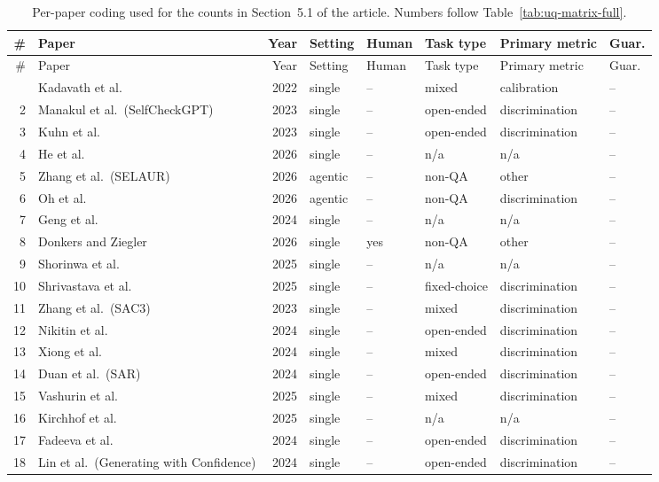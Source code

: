 \documentclass[acmsmall]{acmart}
\begin{document}
{\small
\begin{longtable}{@{}r p{4.1cm} r l l l l l@{}}
\caption{Per-paper coding used for the counts in Section~5.1 of the article. Numbers follow Table~\ref{tab:uq-matrix-full}.}\label{tab:coding}\\
\toprule
\# & Paper & Year & Setting & Human & Task type & Primary metric & Guar.\\
\midrule
\endfirsthead
\toprule
\# & Paper & Year & Setting & Human & Task type & Primary metric & Guar.\\
\midrule
\endhead
\bottomrule
\endfoot
1 & Kadavath et al. & 2022 & single & -- & mixed & calibration & -- \\
2 & Manakul et al.\ (SelfCheckGPT) & 2023 & single & -- & open-ended & discrimination & -- \\
3 & Kuhn et al. & 2023 & single & -- & open-ended & discrimination & -- \\
4 & He et al. & 2026 & single & -- & n/a & n/a & -- \\
5 & Zhang et al.\ (SELAUR) & 2026 & agentic & -- & non-QA & other & -- \\
6 & Oh et al. & 2026 & agentic & -- & non-QA & discrimination & -- \\
7 & Geng et al. & 2024 & single & -- & n/a & n/a & -- \\
8 & Donkers and Ziegler & 2026 & single & yes & non-QA & other & -- \\
9 & Shorinwa et al. & 2025 & single & -- & n/a & n/a & -- \\
10 & Shrivastava et al. & 2025 & single & -- & fixed-choice & discrimination & -- \\
11 & Zhang et al.\ (SAC3) & 2023 & single & -- & mixed & discrimination & -- \\
12 & Nikitin et al. & 2024 & single & -- & open-ended & discrimination & -- \\
13 & Xiong et al. & 2024 & single & -- & mixed & discrimination & -- \\
14 & Duan et al.\ (SAR) & 2024 & single & -- & open-ended & discrimination & -- \\
15 & Vashurin et al. & 2025 & single & -- & mixed & discrimination & -- \\
16 & Kirchhof et al. & 2025 & single & -- & n/a & n/a & -- \\
17 & Fadeeva et al. & 2024 & single & -- & open-ended & discrimination & -- \\
18 & Lin et al.\ (Generating with Confidence) & 2024 & single & -- & open-ended & discrimination & -- \\

\end{longtable}}
\end{document}
